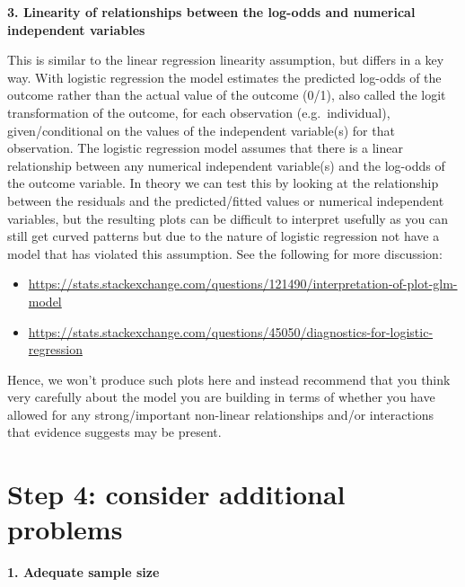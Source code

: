 \documentclass[
]{book}
\begin{document}
\textbf{3. Linearity of relationships between the log-odds and numerical independent variables}

This is similar to the linear regression linearity assumption, but differs in a key way. With logistic regression the model estimates the predicted log-odds of the outcome rather than the actual value of the outcome (0/1), also called the logit transformation of the outcome, for each observation (e.g.~individual), given/conditional on the values of the independent variable(s) for that observation. The logistic regression model assumes that there is a linear relationship between any numerical independent variable(s) and the log-odds of the outcome variable. In theory we can test this by looking at the relationship between the residuals and the predicted/fitted values or numerical independent variables, but the resulting plots can be difficult to interpret usefully as you can still get curved patterns but due to the nature of logistic regression not have a model that has violated this assumption. See the following for more discussion:

\begin{itemize}
\item
  \url{https://stats.stackexchange.com/questions/121490/interpretation-of-plot-glm-model}
\item
  \url{https://stats.stackexchange.com/questions/45050/diagnostics-for-logistic-regression}
\end{itemize}

Hence, we won't produce such plots here and instead recommend that you think very carefully about the model you are building in terms of whether you have allowed for any strong/important non-linear relationships and/or interactions that evidence suggests may be present.

\hypertarget{step-4-consider-additional-problems}{%
\section{Step 4: consider additional problems}\label{step-4-consider-additional-problems}}

\textbf{1. Adequate sample size}
\end{document}
